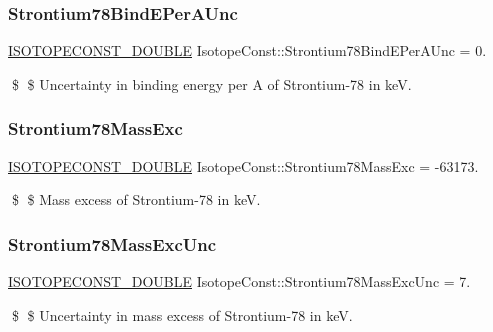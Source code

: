 \subsubsection{\texorpdfstring{Strontium78\+Bind\+E\+Per\+A\+Unc}{Strontium78BindEPerAUnc}}
{\footnotesize\ttfamily \mbox{\hyperlink{group___isotope_const-_macros_ga8f45a7272ce02c0b4c65c44636ed719a}{I\+S\+O\+T\+O\+P\+E\+C\+O\+N\+S\+T\+\_\+\+D\+O\+U\+B\+LE}} Isotope\+Const\+::\+Strontium78\+Bind\+E\+Per\+A\+Unc = 0.}

\$ \$ Uncertainty in binding energy per A of Strontium-\/78 in keV. \mbox{\label{group___isotope_const-_strontium-_sr78_ga6bd9eb3d7701be32d7efc1dea2db3349}} 
\subsubsection{\texorpdfstring{Strontium78\+Mass\+Exc}{Strontium78MassExc}}
{\footnotesize\ttfamily \mbox{\hyperlink{group___isotope_const-_macros_ga8f45a7272ce02c0b4c65c44636ed719a}{I\+S\+O\+T\+O\+P\+E\+C\+O\+N\+S\+T\+\_\+\+D\+O\+U\+B\+LE}} Isotope\+Const\+::\+Strontium78\+Mass\+Exc = -\/63173.}

\$ \$ Mass excess of Strontium-\/78 in keV. \mbox{\label{group___isotope_const-_strontium-_sr78_gaa50b62793c2b30a61abbcaf2283870b4}} 
\subsubsection{\texorpdfstring{Strontium78\+Mass\+Exc\+Unc}{Strontium78MassExcUnc}}
{\footnotesize\ttfamily \mbox{\hyperlink{group___isotope_const-_macros_ga8f45a7272ce02c0b4c65c44636ed719a}{I\+S\+O\+T\+O\+P\+E\+C\+O\+N\+S\+T\+\_\+\+D\+O\+U\+B\+LE}} Isotope\+Const\+::\+Strontium78\+Mass\+Exc\+Unc = 7.}

\$ \$ Uncertainty in mass excess of Strontium-\/78 in keV. \mbox{\label{group___isotope_const-_strontium-_sr78_ga4c80a91fd4b99dc92a5da89ca1562460}} 
